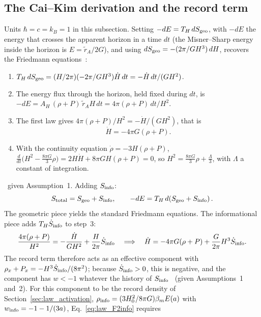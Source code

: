 \subsection{The Cai--Kim derivation and the record term}\label{sec:law_caikim}
Units $\hbar=c=k_B=1$ in this subsection. Setting $-dE=T_H\,dS_{\rm geo}$, with $-dE$ the energy that crosses the apparent horizon in a time $dt$ (the
Misner--Sharp energy~\cite{MisnerSharp1964,Hayward1998} inside the horizon is $E=\tilde r_A/2G$), and using $dS_{\rm geo}=-(2\pi/GH^3)\,dH$, recovers the
Friedmann equations~\cite{CaiKim2005,AkbarCai2007}:
\begin{enumerate}
\item $T_H\,dS_{\rm geo}=(H/2\pi)(-2\pi/GH^3)\dot H\,dt=-\dot H\,dt/(GH^2)$.
\item The energy flux through the horizon, held fixed during $dt$, is $-dE=A_H\,(\rho+P)\,\tilde r_AH\,dt=4\pi(\rho+P)\,dt/H^2$.
\item The first law gives $4\pi(\rho+P)/H^2=-\dot H/(GH^2)$, that is
\begin{equation}
\dot H=-4\pi G(\rho+P). \label{eq:law_F2}
\end{equation}
\item With the continuity equation $\dot\rho=-3H(\rho+P)$, $\tfrac{d}{dt}\big(H^2-\tfrac{8\pi G}{3}\rho\big)=2H\dot H+8\pi GH(\rho+P)=0$, so
$H^2=\tfrac{8\pi G}{3}\rho+\tfrac\Lambda3$, with $\Lambda$ a constant of integration.
\end{enumerate}
\derived\ given Assumption~1. Adding $S_{\rm info}$:
\begin{equation}
S_{\rm total}=S_{\rm geo}+S_{\rm info},\qquad -dE=T_H\,d\!\left(S_{\rm geo}+S_{\rm info}\right). \label{eq:firstlaw}
\end{equation}
The geometric piece yields the standard Friedmann equations. The informational piece adds $T_H\dot S_{\rm info}$ to step~3:
\begin{equation}
\frac{4\pi(\rho+P)}{H^2}=-\frac{\dot H}{GH^2}+\frac{H}{2\pi}\dot S_{\rm info}\quad\Longrightarrow\quad
\dot H=-4\pi G(\rho+P)+\frac{G}{2\pi}H^3\dot S_{\rm info}. \label{eq:law_F2info}
\end{equation}
The record term therefore acts as an effective component with $\rho_x+P_x=-H^3\dot S_{\rm info}/(8\pi^2)$; because $\dot S_{\rm info}>0$, this is negative,
and the component has $w<-1$ whatever the history of $S_{\rm info}$ \derived\ (given Assumptions~1 and~2). For this component to be the record density of
Section~\ref{sec:law_activation}, $\rho_{\rm info}=(3H_0^2/8\pi G)\beta_mE(a)$ with $w_{\rm info}=-1-1/(3a)$, Eq.~\eqref{eq:law_F2info} requires
